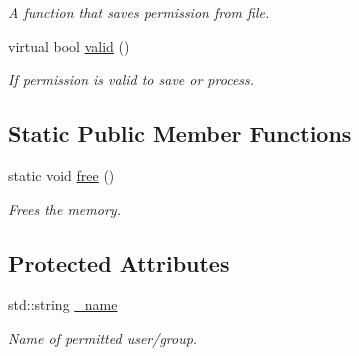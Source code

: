 \begin{DoxyCompactItemize}
\begin{DoxyCompactList}\small\item\em A function that saves permission from file. \end{DoxyCompactList}\item 
virtual bool \hyperlink{class_r_c_f_1_1_server_1_1_permission_a49a881e193458e71d0249f2f6d5a8b56}{valid} ()
\begin{DoxyCompactList}\small\item\em If permission is valid to save or process. \end{DoxyCompactList}\end{DoxyCompactItemize}
\subsection*{Static Public Member Functions}
\begin{DoxyCompactItemize}
\item 
\hypertarget{class_r_c_f_1_1_server_1_1_permission_ab022718461c9a1772e1c992769cadc56}{}static void \hyperlink{class_r_c_f_1_1_server_1_1_permission_ab022718461c9a1772e1c992769cadc56}{free} ()\label{class_r_c_f_1_1_server_1_1_permission_ab022718461c9a1772e1c992769cadc56}

\begin{DoxyCompactList}\small\item\em Frees the memory. \end{DoxyCompactList}\end{DoxyCompactItemize}
\subsection*{Protected Attributes}
\begin{DoxyCompactItemize}
\item 
\hypertarget{class_r_c_f_1_1_server_1_1_permission_a3131b4c6d242ec0b482cc7c44e4dabb2}{}std\+::string \hyperlink{class_r_c_f_1_1_server_1_1_permission_a3131b4c6d242ec0b482cc7c44e4dabb2}{\+\_\+name}\label{class_r_c_f_1_1_server_1_1_permission_a3131b4c6d242ec0b482cc7c44e4dabb2}

\begin{DoxyCompactList}\small\item\em Name of permitted user/group. \end{DoxyCompactList}\end{DoxyCompactItemize}
